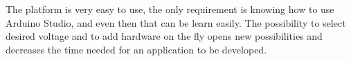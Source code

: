 The platform is very easy to use, the only requirement is knowing how to use Arduino Studio, and
even then that can be learn easily. The possibility to select desired voltage and to add hardware on
the fly opens new possibilities and decreases the time needed for an application to be developed.


